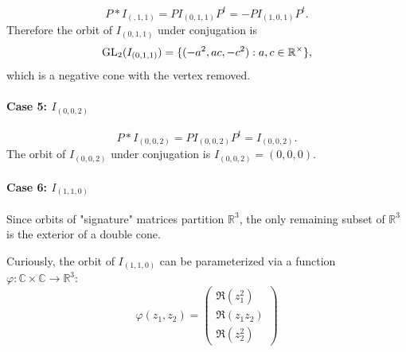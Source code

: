 \documentclass{article}
\theoremstyle{definition}
\newcommand{\R}{\mathbb{R}}
\newcommand{\C}{\mathbb{C}}
\newcommand{\GL}{\operatorname{GL}}
\DeclarePairedDelimiter\set{\{}{\}}
\begin{document}
\[
    P * I_{(,1,1)} = P I_{(0,1,1)} P^t = - P I_{(1,0,1)} P^t.
\]
Therefore the orbit of $I_{(0,1,1)}$ under conjugation is
\[
	\GL_2 (I_{(0,1,1)}) = \set{(-a^2, ac, -c^2): a,c \in \R^\times},
\]
which is a negative cone with the vertex removed. 

\paragraph{Case 5: $I_{(0,0,2)}$}

\[
	P * I_{(0,0,2)} = P I_{(0,0,2)} P^t = I_{(0,0,2)}.
\]
The orbit of $I_{(0,0,2)}$ under conjugation is $I_{(0,0,2)} = (0,0,0)$.

\paragraph{Case 6: $I_{(1,1,0)}$}

Since orbits of "signature" matrices partition $\R^3$, the only remaining subset of $\R^3$ is the exterior of a double cone.

Curiously, the orbit of $I_{(1,1,0)}$ can be parameterized via a function $\varphi : \C \times \C \to \R^3$:
\begin{equation} \label{eq:case6}
    \varphi(z_1, z_2) =
    \begin{pmatrix}
        \Re (z_1^2) \\
        \Re (z_1 z_2) \\
        \Re (z_2^2)
    \end{pmatrix}
\end{equation}
\end{document}

